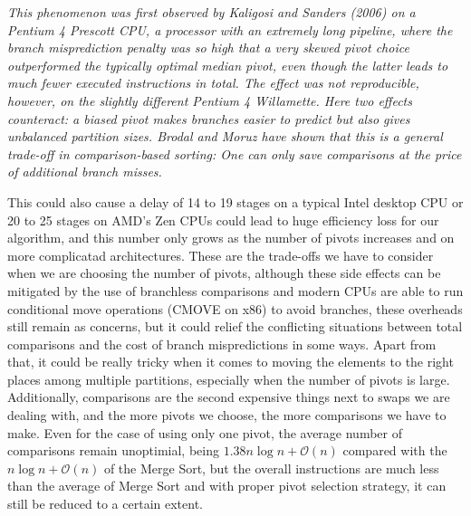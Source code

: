 \documentclass{article}
\newcommand{\bigO}{\mathcal{O}}
\begin{document}
\hypertarget{ref:BranchMisses}{}
\textit{This phenomenon was first observed by Kaligosi and Sanders (2006) on a Pentium 4 Prescott CPU, a processor with an extremely long pipeline, where the branch misprediction penalty was so high that a very skewed pivot choice outperformed the typically optimal median pivot, even though the latter leads to much fewer executed instructions in total.
The effect was not reproducible, however, on the slightly different Pentium 4 Willamette. Here two effects counteract: a biased pivot makes branches easier to predict but also gives unbalanced partition sizes. Brodal and Moruz have shown that this is a general trade-off in comparison-based sorting: One can only save comparisons at the price of additional branch misses.}
\cite{AnalysisOfBranchMissesInQuickSort}

This could also cause a delay of 14 to 19 stages on a typical Intel desktop CPU or 20 to 25 stages on AMD's Zen CPUs could lead to huge efficiency loss for our algorithm,
and this number only grows as the number of pivots increases and on more complicatad architectures. These are the trade-offs we have to consider when we are choosing the number of pivots,
although these side effects can be mitigated by the use of branchless comparisons and modern CPUs are able to run conditional move operations (CMOVE on x86) to avoid branches,
these overheads still remain as concerns, but it could relief the conflicting situations between total comparisons and the cost of branch mispredictions in some ways.
Apart from that, it could be really tricky when it comes to moving the elements to the right places among multiple partitions, especially when the number of pivots is large.
Additionally, comparisons are the second expensive things next to swaps we are dealing with, and the more pivots we choose, the more comparisons we have to make.
Even for the case of using only one pivot, the average number of comparisons remain unoptimial, being $1.38n\log n + \bigO(n)$ compared with the $n\log n + \bigO(n)$ of the Merge Sort,
but the overall instructions are much less than the average of Merge Sort and with proper pivot selection strategy, it can still be reduced to a certain extent.

\end{document}
